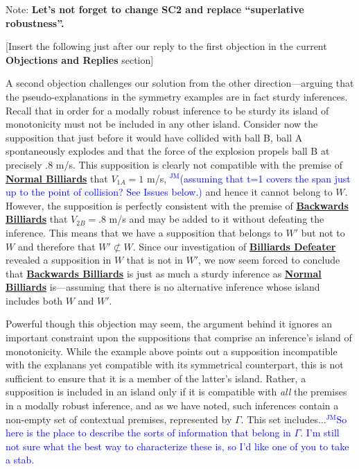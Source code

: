 \documentclass{article}                     %
\theoremstyle{definition}
\newcommand{\jm}[1]{\textcolor{blue}{$^{\textrm{JM}}${#1}}}
\begin{document}
\sloppy
\raggedbottom
\title{\vspace{-3cm}}

\raggedbottom

\maketitle

{\large Note: \textbf{Let's not forget to change SC2 and replace ``superlative robustness''.}}
\vspace{3mm}




[Insert the following just after our reply to the first objection in the current \textbf{Objections and Replies} section]

A second objection challenges our solution from the other direction---arguing that the pseudo-explanations in the symmetry examples are in fact sturdy inferences. Recall that in order for a modally robust inference to be sturdy its island of monotonicity must not be included in any other island. Consider now the supposition that just before it would have collided with ball B, ball A spontaneously explodes and that the force of the explosion propels ball B at precisely .8 m/s. This supposition is clearly not compatible with the premise of \hyperref[eq:MRC_ballsforward]{\textbf{Normal Billiards}} that $ V_{1A} = 1 $ m/s, \jm{(assuming that t=1 covers the span just up to the point of collision? See Issues below.)} and hence it cannot belong to $W$. However, the supposition is perfectly consistent with the premise of \hyperref[eq:MRC_ballsbackwards]{\textbf{Backwards Billiards}} that  $ V_{2B} = .8 $ m/s and may be added to it without defeating the inference. This means that we have a supposition that belongs to $W'$ but not to $W$ and therefore that $ W' \not\subset W $. Since our investigation of \hyperref[eq:MRC_defeater]{\textbf{Billiards Defeater}} revealed a supposition in $W$  that is not in $W'$, we now seem forced to conclude that \hyperref[eq:MRC_ballsbackwards]{\textbf{Backwards Billiards}} is just as much a sturdy inference as \hyperref[eq:MRC_ballsforward]{\textbf{Normal Billiards}} is---assuming that there is no alternative inference whose island includes both $W$ and $W'$.

Powerful though this objection may seem, the argument behind it ignores an important constraint upon the suppositions that comprise an inference's island of monotonicity. While the example above points out a supposition incompatible with the  explanans yet compatible with its symmetrical counterpart, this is not sufficient to ensure that it is a member of the latter's island. Rather, a supposition is included in an island only if it is compatible with \textit{all} the premises in a modally robust inference, and as we have noted, such inferences contain a non-empty set of contextual premises, represented by $ \Gamma $.  This set includes...\jm{So here is the place to describe the sorts of information that belong in $ \Gamma $. I'm still not sure what the best way to characterize these is, so I'd like one of you to take a stab.}
	
\end{document}
